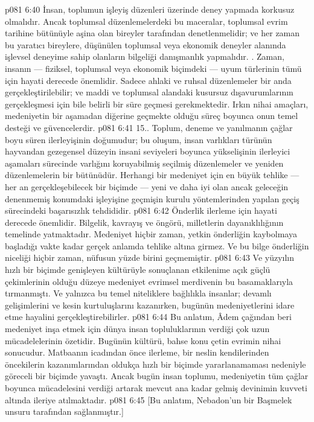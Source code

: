 \vs p081 6:40 İnsan, toplumun işleyiş düzenleri üzerinde deney yapmada korkusuz olmalıdır. Ancak toplumsal düzenlemelerdeki bu maceralar, toplumsal evrim tarihine bütünüyle aşina olan bireyler tarafından denetlenmelidir; ve her zaman bu yaratıcı bireylere, düşünülen toplumsal veya ekonomik deneyler alanında işlevsel deneyime sahip olanların bilgeliği danışmanlık yapmalıdır. . Zaman, insanın --- fiziksel, toplumsal veya ekonomik biçimdeki --- uyum türlerinin tümü için hayati derecede önemlidir. Sadece ahlaki ve ruhsal düzenlemeler bir anda gerçekleştirilebilir; ve maddi ve toplumsal alandaki kusursuz dışavurumlarının gerçekleşmesi için bile belirli bir süre geçmesi gerekmektedir. Irkın nihai amaçları, medeniyetin bir aşamadan diğerine geçmekte olduğu süreç boyunca onun temel desteği ve güvencelerdir.
\vs p081 6:41 15.\bibnobreakspace {}. Toplum, deneme ve yanılmanın çağlar boyu süren ilerleyişinin doğumudur; bu oluşum, insan varlıkları türünün hayvandan gezegensel düzeyin insani seviyeleri boyunca yükselişinin ilerleyici aşamaları sürecinde varlığını koruyabilmiş seçilmiş düzenlemeler ve yeniden düzenlemelerin bir bütünüdür. Herhangi bir medeniyet için en büyük tehlike --- her an gerçekleşebilecek bir biçimde --- yeni ve daha iyi olan ancak geleceğin denenmemiş konumdaki işleyişine geçmişin kurulu yöntemlerinden yapılan geçiş sürecindeki başarısızlık tehdididir.
\vs p081 6:42 Önderlik ilerleme için hayati derecede önemlidir. Bilgelik, kavrayış ve öngörü, milletlerin dayanıklılığının temelinde yatmaktadır. Medeniyet hiçbir zaman, yetkin önderliğin kaybolmaya başladığı vakte kadar gerçek anlamda tehlike altına girmez. Ve bu bilge önderliğin niceliği hiçbir zaman, nüfusun yüzde birini geçmemiştir.
\vs p081 6:43 Ve yüzyılın hızlı bir biçimde genişleyen kültürüyle sonuçlanan etkilenime açık güçlü çekimlerinin olduğu düzeye medeniyet evrimsel merdivenin bu basamaklarıyla tırmanmıştı. Ve yalnızca bu temel niteliklere bağlılıkla insanlar; devamlı gelişimlerini ve kesin kurtuluşlarını kazanırken, bugünün medeniyetlerini idare etme hayalini gerçekleştirebilirler.
\vs p081 6:44 Bu anlatım, Âdem çağından beri medeniyet inşa etmek için dünya insan topluluklarının verdiği çok uzun mücadelelerinin özetidir. Bugünün kültürü, bahse konu çetin evrimin nihai sonucudur. Matbaanın icadından önce ilerleme, bir neslin kendilerinden öncekilerin kazanımlarından oldukça hızlı bir biçimde yararlanamaması nedeniyle göreceli bir biçimde yavaştı. Ancak bugün insan toplumu, medeniyetin tüm çağlar boyunca mücadelesini verdiği artarak mevcut ana kadar gelmiş devinimin kuvveti altında ileriye atılmaktadır.
\vs p081 6:45 [Bu anlatım, Nebadon’un bir Başmelek unsuru tarafından sağlanmıştır.]
